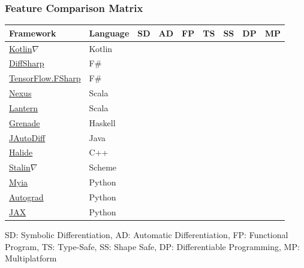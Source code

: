 \documentclass{beamer}
\newcommand{\wmark}{\textcolor{orange}{\ding{45}}}
\newcommand{\cmark}{\textcolor{green!80!black}{\ding{51}}}
\newcommand{\xmark}{\textcolor{red}{\ding{55}}}
\begin{document}
    \begin{frame}
        \frametitle{Feature Comparison Matrix}
            \begin{center}
            \begin{tabular}{lllllllll}
            \textbf{Framework} & \textbf{Language}                                    & SD      & AD     & FP     & TS     & SS     & DP     & MP    \\ \hline
            \href{https://github.com/breandan/kotlingrad}{Kotlin$\nabla$}                & Kotlin  & \cmark & \cmark & \cmark & \cmark & \cmark & \wmark & \wmark \\
            \href{http://diffsharp.github.io/DiffSharp/}{DiffSharp}                   & F\#     & \xmark & \cmark & \cmark & \cmark & \xmark & \cmark & \xmark \\
            \href{https://github.com/fsprojects/fsharp-ai-tools}{TensorFlow.FSharp}   & F\#     & \xmark & \cmark & \cmark & \cmark & \cmark & \cmark & \xmark \\
            \href{https://tongfei.me/nexus/}{Nexus}                                   & Scala   & \xmark & \cmark & \cmark & \cmark & \cmark & \cmark & \xmark \\
            \href{https://feiwang3311.github.io/Lantern/}{Lantern}                    & Scala   & \xmark & \cmark & \cmark & \cmark & \xmark & \cmark & \xmark \\
            \href{https://github.com/HuwCampbell/grenade}{Grenade}                    & Haskell & \xmark & \cmark & \cmark & \cmark & \cmark & \xmark & \xmark \\
            \href{http://uniker9.github.io/JAutoDiff/}{JAutoDiff}                     & Java    & \cmark & \cmark & \xmark & \cmark & \xmark & \xmark & \xmark \\
            \href{https://halide-lang.org}{Halide}                                    & C++     & \xmark & \cmark & \xmark & \cmark & \xmark & \cmark & \xmark \\
            \href{https://github.com/Functional-AutoDiff/STALINGRAD}{Stalin$\nabla$}     & Scheme  & \xmark & \cmark & \xmark & \xmark & \xmark & \xmark & \xmark \\
            \href{https://github.com/mila-iqia/myia}{Myia}                            & Python  & \cmark & \cmark & \cmark & \xmark & \xmark & \cmark & \wmark \\
            \href{https://github.com/HIPS/autograd/}{Autograd}                        & Python  & \xmark & \cmark & \xmark & \xmark & \xmark & \xmark & \xmark \\
            \href{https://github.com/google/jax}{JAX}                                 & Python  & \xmark & \cmark & \cmark & \xmark & \xmark & \cmark & \wmark \\
        \end{tabular}
        \end{center}
        \footnotesize{SD: Symbolic Differentiation, AD: Automatic Differentiation, FP: Functional Program, TS: Type-Safe, SS: Shape Safe, DP: Differentiable Programming, MP: Multiplatform}
    \end{frame}
\end{document}
